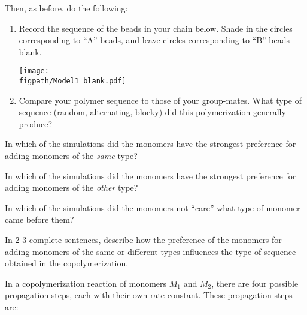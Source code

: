 \begin{activity}[Copolymerization]
\begin{ctqs}
		Then, as before, do the following:
		\begin{enumerate}
			\item Record the sequence of the beads in your chain below.  Shade in the circles corresponding to ``A'' beads, and leave circles corresponding to ``B'' beads blank.
	
		\vspace{6pt}
		\centerline{\texttt{[image: \\figpath/Model1\_blank.pdf]}}
	
			\item Compare your polymer sequence to those of your group-mates.  What type of sequence (random, alternating, blocky) did this polymerization generally produce?
			
				\begin{solution}[1.25in]
				\end{solution}
		\end{enumerate}
		
	\question In which of the simulations did the monomers have the strongest preference for adding monomers of the \emph{same} type?
	
		\begin{solution}[0.85in]
		\end{solution}
	
	\question In which of the simulations did the monomers have the strongest preference for adding monomers of the \emph{other} type?
	
		\begin{solution}[0.85in]
		\end{solution}
	
	\question In which of the simulations did the monomers not ``care'' what type of monomer came before them?
	
		\begin{solution}[0.85in]
		\end{solution}
	
	\question In 2-3 complete sentences, describe how the preference of the monomers for adding monomers of the same or different types influences the type of sequence obtained in the copolymerization.
	
		\begin{solution}[2in]
		\end{solution}
\end{ctqs}

\begin{model}

	In a copolymerization reaction of monomers $M_1$ and $M_2$, there are four possible propagation steps, each with their own rate constant.  These propagation steps are:
	

\end{model}
\end{activity}
